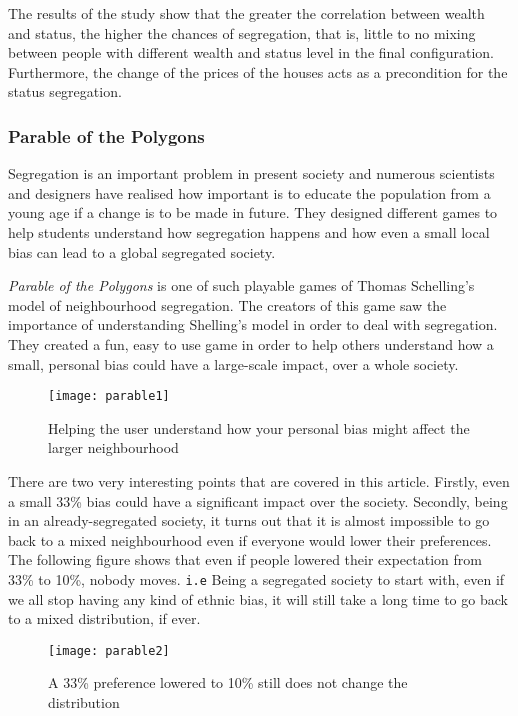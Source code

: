 \documentclass[../main.tex]{subfiles}
\begin{document}
 The results of the study show that the greater the correlation between wealth and status, the higher the chances of segregation, that is, little to no mixing between people with different wealth and status level in the final configuration. Furthermore, the change of the prices of the houses acts as a precondition for the status segregation.

\subsubsection{Parable of the Polygons }
Segregation is an important problem in present society and numerous scientists and designers have realised how important is to educate the population from a young age if a change is to be made in future. They designed different games to help students understand how segregation happens and how even a small local bias can lead to a global segregated society.

\textit{Parable of the Polygons} \cite[]{parable} is one of such playable games of Thomas Schelling's model of neighbourhood segregation. The creators of this game saw the importance of understanding Shelling's model in order to deal with segregation. They created a fun, easy to use game in order to help others understand how a small, personal bias could have a large-scale impact, over a whole society.

\begin{figure}[H]
\centering
\texttt{[image: parable1]}
\caption{Helping the user understand how your personal bias might affect the larger neighbourhood}
\end{figure}

There are two very interesting points that are covered in this article. Firstly, even a small 33\% bias could have a significant impact over the society. Secondly, being in an already-segregated society, it turns out that it is almost impossible to go back to a mixed neighbourhood even if everyone would lower their preferences. The following figure shows that even if people lowered their expectation from 33\% to 10\%, nobody moves. \verb|i.e| Being a segregated society to start with, even if we all stop having any kind of ethnic bias, it will still take a long time to go back to a mixed distribution, if ever.

\begin{figure}[H]
\centering
\texttt{[image: parable2]}
\caption{A 33\% preference lowered to 10\% still does not change the distribution}
\end{figure}
\end{document}
